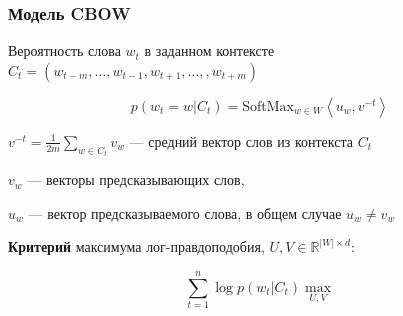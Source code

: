 \documentclass[fullscreen=true, bookmarks=true, hyperref={pdfencoding=unicode}]{beamer}
\begin{document}
\begin{frame}
  \frametitle{Модель CBOW}

  Вероятность слова $w_t$ в заданном контексте $C_t = (w_{t-m}, \dots, w_{t-1}, w_{t+1}, \dots, , w_{t+m})$

  $$p(w_{t} = w|C_t) = \text{SoftMax}_{w \in W} \left<u_w, v^{-t} \right> $$

  $v^{-t} = \frac{1}{2m} \sum\limits_{w \in C_t} v_w$ — средний вектор слов из контекста $C_t$

  $v_w$ — векторы предсказывающих слов,

  $u_w$ — вектор предсказываемого слова, в общем случае $u_w \neq v_w$

  \vspace{1cm}
  {\bf Критерий} максимума лог-правдоподобия, $U, V \in \mathbb{R}^{|W| \times d}$:

  $$ \sum\limits_{t=1}^n \log p(w_t|C_t) \max\limits_{U, V} $$

\end{frame}
\end{document}
